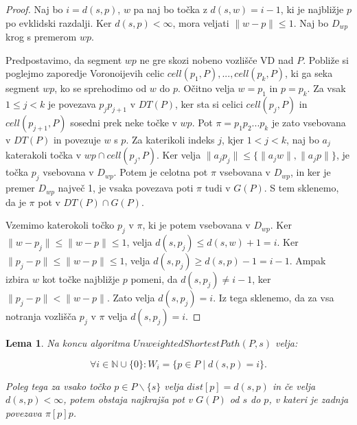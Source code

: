 \documentclass[a4paper, 12pt]{book}
\newcommand{\NN}{\ensuremath{\mathbb N}}  %
\newtheorem{lema}[izrek]{Lema}
\begin{document}
\begin{proof}
Naj bo $i = d(s,p)$, $w$ pa naj bo točka z $d(s,w) = i - 1$, ki je najbližje $p$ po evklidski razdalji. Ker $d(s,p) < \infty$, mora veljati $\|w - p\| \leq 1$. Naj bo $D_{wp}$ krog s premerom $wp$.

Predpostavimo, da segment $wp$ ne gre skozi nobeno vozlišče VD nad $P$.  Pobliže si poglejmo zaporedje Voronoijevih celic $cell(p_1, P),..., cell(p_k, P)$, ki ga seka segment $wp$, ko se sprehodimo od $w$ do $p$. Očitno velja $w = p_1$ in $p = p_k$. Za vsak $1 \leq j < k$ je povezava $p_jp_{j+1}$ v $DT(P)$, ker sta si celici $cell(p_j, P)$ in $cell(p_{j+1}, P)$ sosedni prek neke točke v $wp$. Pot $\pi = p_1p_2...p_k$ je zato vsebovana v $DT(P)$ in povezuje $w$ s $p$. Za katerikoli indeks $j$, kjer $1 < j < k$, naj bo $a_j$ katerakoli točka v $wp \cap cell(p_j, P)$. Ker velja $\|a_jp_j\| \leq \{\|a_jw\|, \|a_jp\|\}$, je točka $p_j$ vsebovana v $D_{wp}$. Potem je celotna pot $\pi$ vsebovana v $D_{wp}$, in ker je premer $D_{wp}$ največ 1, je vsaka povezava poti $\pi$ tudi v $G(P)$. S tem sklenemo, da je $\pi$ pot v $DT(P) \cap G(P)$.

Vzemimo katerokoli točko $p_j$ v $\pi$, ki je potem vsebovana v $D_{wp}$. Ker $\|w - p_j\| \leq \|w - p\| \leq 1$, velja $d(s, p_j) \leq d(s, w) + 1 = i$. Ker $\|p_j - p\| \leq \|w - p\| \leq 1$, velja $d(s, p_j) \geq d(s, p) - 1 = i - 1$. Ampak izbira $w$ kot točke najbližje $p$ pomeni, da $d(s, p_j) \neq i - 1$, ker $\|p_j - p\| < \|w - p\|$. Zato velja $d(s, p_j) = i$. Iz tega sklenemo, da za vsa notranja vozlišča $p_j$ v $\pi$ velja $d(s, p_j) = i$. 
\end{proof}

\begin{lema}
\label{lema2}
Na koncu algoritma $UnweightedShortestPath(P, s)$ velja:

\begin{equation}
\forall i \in \NN \cup \{0\}:  W_i = \{p\in P \mid d(s, p) = i\}.
\end{equation}

Poleg tega za vsako točko $p \in P \backslash \{s\}$ velja $dist[p] = d(s,p)$ in če velja $d(s,p) < \infty$, potem obstaja najkrajša pot v $G(P)$ od $s$ do $p$, v kateri je zadnja povezava $\pi [p]p$.
\end{lema}
\end{document}
